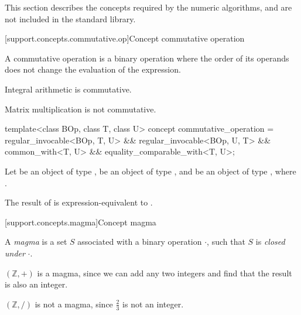 This section describes the concepts required by the numeric algorithms, and are not included in the
\Cpp standard library.

[support.concepts.commutative.op]{Concept commutative operation}

\pnum
A commutative operation is a binary operation where the order of its operands does not change the
evaluation of the expression.

\pnum
\begin{example}
   Integral arithmetic is commutative.
\end{example}

\pnum
\begin{example}
   Matrix multiplication is not commutative.
\end{example}

\begin{itemdecl}
  template<class BOp, class T, class U>
  concept commutative_operation =
    regular_invocable<BOp, T, U> &&
    regular_invocable<BOp, U, T> &&
    common_with<T, U> &&
    equality_comparable_with<T, U>;
\end{itemdecl}
\begin{itemdescr}
   \pnum
   Let  be an object of type ,  be an object of type , and
    be an object of type , where .

   \pnum
   The result of  is expression-equivalent to .
\end{itemdescr}

[support.concepts.magma]{Concept magma}

\pnum
A \textit{magma} is a set $S$ associated with a binary operation $\cdot$, such that $S$ is
\textit{closed under} $\cdot$.

\pnum
\begin{example}
   $(\mathbb{Z}, +)$ is a magma, since we can add any two integers and find that the result is also
   an integer.
\end{example}

\pnum
\begin{example}
   $(\mathbb{Z}, /)$ is not a magma, since $\frac{2}{3}$ is not an integer.
\end{example}


